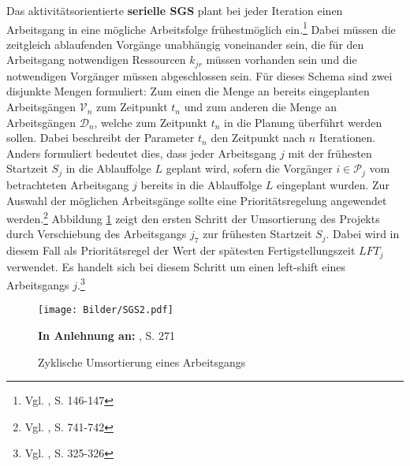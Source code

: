 \documentclass[a4paper,12pt,normalheadings,footexclude,headinclude,liststotoc,nochapterprefix,onecolumn,oneside,parskip,pointlessnumbers]{scrreprt}
\begin{document}
Das aktivitätsorientierte \textbf{serielle SGS} plant bei jeder Iteration einen Arbeitsgang in eine mögliche Arbeitsfolge frühestmöglich ein.\footnote{Vgl. \cite{brucker2006complex}, S. 146-147\label{dingeskrichen}} Dabei müssen die zeitgleich ablaufenden Vorgänge unabhängig voneinander sein, die für den Arbeitsgang notwendigen Ressourcen $k_{jr}$ müssen vorhanden sein und die notwendigen Vorgänger müssen abgeschlossen sein. Für dieses Schema sind zwei disjunkte Mengen formuliert: Zum einen die Menge an bereits eingeplanten Arbeitsgängen $\mathcal{V}_{n}$ zum Zeitpunkt $t_{n}$ und zum anderen die Menge an Arbeitsgängen $\mathcal{D}_{n}$, welche zum Zeitpunkt $t_{n}$ in die Planung überführt werden sollen. Dabei beschreibt der Parameter $t_{n}$ den Zeitpunkt nach $n$ Iterationen. Anders formuliert bedeutet dies, dass jeder Arbeitsgang $j$ mit der frühesten Startzeit $S_{j}$ in die Ablauffolge $L$ geplant wird, sofern die Vorgänger $i \in \mathcal{P}_{j}$ vom betrachteten Arbeitsgang $j$ bereits %
in die Ablauffolge $L$ eingeplant wurden. Zur Auswahl der möglichen Arbeitsgänge sollte eine Prioritätsregelung angewendet werden.\footnote{Vgl. \cite{hartmann1998competitive}, S. 741-742\label{hartmann}} Abbildung \ref{umsortiert} zeigt den ersten Schritt der Umsortierung des Projekts durch Verschiebung des Arbeitsgangs $j_{7}$ zur frühesten Startzeit $S_{j}$. Dabei wird in diesem Fall als Prioritätsregel der Wert der spätesten Fertigstellungszeit $LFT_{j}$ verwendet. Es handelt sich bei diesem Schritt um einen left-shift eines Arbeitsgangs $j$.\footnote{Vgl. \cite{kolisch1996serial}, S. 325-326}\\

\begin{figure}[h!]
  \begin{center}
\texttt{[image: Bilder/SGS2.pdf]}
 \caption{Zyklische Umsortierung eines Arbeitsgangs}\label{umsortiert}
   {\footnotesize  \textbf{In Anlehnung an:} \cite{bouleimen2003new}, S. 271}
  \end{center}
\end{figure}
\end{document}
